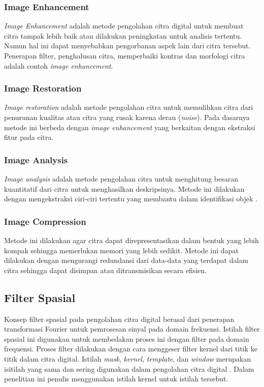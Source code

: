 \subsubsection{Image Enhancement}
\textit{Image Enhancement} adalah metode pengolahan citra digital untuk membuat citra tampak lebih baik atau dilakukan peningkatan untuk analisis tertentu. Namun hal ini dapat menyebabkan pengorbanan aspek lain dari citra tersebut. Penerapan filter, penghalusan citra, memperbaiki kontras dan morfologi citra adalah contoh \textit{image enhancement}.

\subsubsection{Image Restoration}
\textit{Image restoration} adalah metode pengolahan citra untuk memulihkan citra dari penurunan kualitas atau citra yang rusak karena derau (\textit{noise}). Pada dasarnya metode ini berbeda dengan \textit{image enhancement} yang berkaitan dengan ekstraksi fitur pada citra. 

\subsubsection{Image Analysis}
\textit{Image analysis} adalah metode pengolahan citra untuk menghitung besaran kuantitatif dari citra untuk menghasilkan deskripsinya. Metode ini dilakukan dengan mengekstraksi ciri-ciri tertentu yang membantu dalam identifikasi objek .

\subsubsection{Image Compression}
Metode ini dilakukan agar citra dapat direpresentasikan dalam bentuk yang lebih kompak sehingga memerlukan memori yang lebih sedikit. Metode ini dapat dilakukan dengan mengurangi redundansi dari data-data yang terdapat dalam citra sehingga dapat disimpan atau ditransmisikan secara efisien.


\subsection{Filter Spasial}
Konsep filter spasial pada pengolahan citra digital berasal dari penerapan transformasi Fourier untuk pemrosesan sinyal pada domain frekuensi. Istilah filter spasial ini digunakan untuk membedakan proses ini dengan filter pada domain frequensi. Proses filter dilakukan dengan cara menggeser filter kernel dari titik ke titik dalam citra digital. Istilah \textit{mask}, \textit{kernel}, \textit{template}, dan \textit{window} merupakan isitilah yang sama dan sering digunakan dalam pengolahan citra digital . Dalam penelitian ini penulis menggunakan istilah kernel untuk istilah tersebut.


